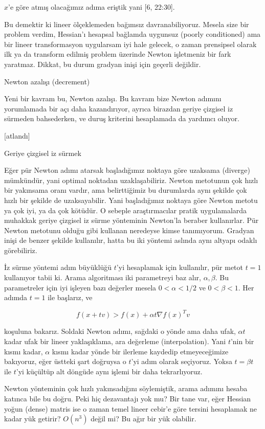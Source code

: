 \documentclass[12pt,fleqn]{article}\usepackage{../../common}
\begin{document}
$x$'e göre atmış olacağımız adıma eriştik yani [6, 22:30]. 

Bu demektir ki lineer ölçeklemeden bağımsız davranabiliyoruz. Mesela size
bir problem verdim, Hessian'ı hesapsal bağlamda uygunsuz (poorly
conditioned) ama bir lineer transformasyon uygularsam iyi hale gelecek, o
zaman prensipsel olarak ilk ya da transform edilmiş problem üzerinde Newton
işletmeniz bir fark yaratmaz.  Dikkat, bu durum gradyan inişi için geçerli
değildir.

Newton azalışı (decrement)

Yeni bir kavram bu, Newton azalışı. Bu kavram bize Newton adımını
yorumlamada bir açı daha kazandırıyor, ayrıca birazdan geriye çizgisel iz
sürmeden bahsederken, ve duruş kriterini hesaplamada da yardımcı oluyor. 

[atlandı]

Geriye çizgisel iz sürmek

Eğer pür Newton adımı atarsak başladığımız noktaya göre uzaksama (diverge)
mümkündür, yani optimal noktadan uzaklaşabiliriz. Newton metotunun çok
hızlı bir yakınsama oranı vardır, ama belirttiğimiz bu durumlarda aynı
şekilde çok hızlı bir şekilde de uzaksayabilir. Yani başladığımız noktaya
göre Newton metotu ya çok iyi, ya da çok kötüdür. O sebeple araştırmacılar
pratik uygulamalarda muhakkak geriye çizgisel iz sürme yönteminin Newton'la
beraber kullanırlar. Pür Newton metotunu olduğu gibi kullanan neredeyse
kimse tanımıyorum. Gradyan inişi de benzer şekilde kullanılır, hatta bu iki
yöntemi aslında aynı altyapı odaklı görebiliriz.  

İz sürme yöntemi adım büyüklüğü $t$'yi hesaplamak için kullanılır, pür
metot $t=1$ kullanıyor tabii ki.  Arama algoritması iki parametreyi baz
alır, $\alpha,\beta$. Bu parametreler için iyi işleyen bazı değerler mesela 
$0 < \alpha <1/2$ ve $0 < \beta < 1$. Her adımda $t=1$ ile başlarız, ve

$$
f(x+tv) > f(x) + \alpha t \nabla f(x)^T v
$$

koşuluna bakarız. Soldaki Newton adımı, sağdaki o yönde ama daha ufak,
$\alpha t$ kadar ufak bir lineer yaklaşıklama, ara değerleme
(interpolation). Yani $t$'nin bir kısmı kadar, $\alpha$ kısmı kadar yönde
bir ilerleme kaydedip etmeyeceğimize bakıyoruz, eğer üstteki şart doğruysa
o $t$'yi adım olarak seçiyoruz. Yoksa $t = \beta t$ ile $t$'yi küçültüp alt
döngüde aynı işlemi bir daha tekrarlıyoruz. 

Newton yönteminin çok hızlı yakınsadığını söylemiştik, arama adımını hesaba
katınca bile bu doğru. Peki hiç dezavantajı yok mu? Bir tane var, eğer
Hessian yoğun (dense) matris ise o zaman temel lineer cebir'e göre tersini
hesaplamak ne kadar yük getirir? $O(n^3)$ değil mi? Bu ağır bir yük olabilir.
\end{document}
